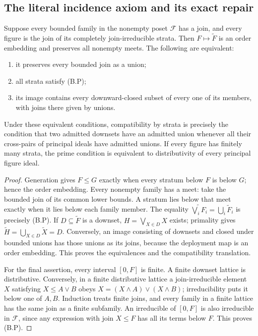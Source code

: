\subsection{The literal incidence axiom and its exact repair}

\begin{theorem}
\label{SA21-B-prime-representation}
Suppose every bounded family in the nonempty poset \(\mathscr F\) has a
join, and every figure is the join of its completely join-irreducible
strata. Then \(F\mapsto\widetilde F\) is an order embedding and preserves
all nonempty meets. The following are equivalent:
\begin{enumerate}
\item it preserves every bounded join as a union;
\item all strata satisfy \textup{(B.P)};
\item its image contains every downward-closed subset of every one of its
members, with joins there given by unions.
\end{enumerate}
Under these equivalent conditions, compatibility by strata is precisely
the condition that two admitted downsets have an admitted union whenever
all their cross-pairs of principal ideals have admitted unions. If every
figure has finitely many strata, the prime condition is equivalent to
distributivity of every principal figure ideal.
\end{theorem}

\begin{proof}
Generation gives \(F\leq G\) exactly when every stratum below \(F\) is
below \(G\); hence the order embedding. Every nonempty family has a meet:
take the bounded join of its common lower bounds. A stratum lies below
that meet exactly when it lies below each family member.
The equality
\(\widetilde{\bigvee_iF_i}=\bigcup_i\widetilde F_i\)
is precisely (B.P). If \(D\subseteq\widetilde F\) is a downset,
\(H=\bigvee_{X\in D}X\) exists; primality gives
\(\widetilde H=\bigcup_{X\in D}\widetilde X=D\).
Conversely, an image consisting of downsets and closed under bounded
unions has those unions as its joins, because the deployment map is an
order embedding. This proves the equivalences and the compatibility
translation.

For the final assertion, every interval \([0,F]\) is finite. A finite
downset lattice is distributive. Conversely, in a finite distributive
lattice a join-irreducible element \(X\) satisfying \(X\leq A\vee B\)
obeys \(X=(X\wedge A)\vee(X\wedge B)\); irreducibility puts it below one
of \(A,B\). Induction treats finite joins, and every family in a finite
lattice has the same join as a finite subfamily. An irreducible of
\([0,F]\) is also irreducible in \(\mathscr F\), since any expression
with join \(X\leq F\) has all its terms below \(F\). This proves (B.P).
\end{proof}

